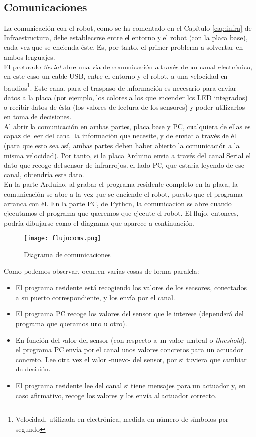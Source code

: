 \subsection{Comunicaciones}\label{subsec:comunicaciones}
La comunicación con el robot, como se ha comentado en el Capítulo \ref{cap:infra} de Infraestructura, debe establecerse entre el entorno y el robot (con la placa base), cada vez que se encienda éste. Es, por tanto, el primer problema a solventar en ambos lenguajes. \\ 
El protocolo \textit{Serial} abre una vía de comunicación a través de un canal electrónico, en este caso un cable USB, entre el entorno y el robot, a una velocidad en baudios\footnote{Velocidad, utilizada en electrónica, medida en número de símbolos por segundo}. Este canal para el traspaso de información es necesario para enviar datos a la placa (por ejemplo, los colores a los que encender los LED integrados) o recibir datos de ésta (los valores de lectura de los sensores) y poder utilizarlos en toma de decisiones. \\
Al abrir la comunicación en ambas partes, placa base y PC, cualquiera de ellas es capaz de leer del canal la información que necesite, y de enviar a través de él (para que esto sea así, ambas partes deben haber abierto la comunicación a la misma velocidad). Por tanto, si la placa Arduino envia a través del canal Serial el dato que recoge del sensor de infrarrojos, el lado PC, que estaría leyendo de ese canal, obtendría este dato. \\
En la parte Arduino, al grabar el programa residente completo en la placa, la comunicación se abre a la vez que se enciende el robot, puesto que el programa arranca con él. En la parte PC, de Python, la comunicación se abre cuando ejecutamos el programa que queremos que ejecute el robot. El flujo, entonces, podría dibujarse como el diagrama que aparece a continuación.
\begin{figure}[h]
	\texttt{[image: flujocoms.png]}
	\centering
	\label{img:FlujoComunicaciones}
	\caption{Diagrama de comunicaciones}
\end{figure}
Como podemos observar, ocurren varias cosas de forma paralela:
\begin{itemize}
	\item El programa residente está recogiendo los valores de los sensores, conectados a su puerto correspondiente, y los envía por el canal.
	\item El programa PC recoge los valores del sensor que le interese (dependerá del programa que queramos uno u otro).
	\item En función del valor del sensor (con respecto a un valor umbral o \textit{threshold}), el programa PC envía por el canal unos valores concretos para un actuador concreto. Lee otra vez el valor -nuevo- del sensor, por si tuviera que cambiar de decisión.
	\item El programa residente lee del canal si tiene mensajes para un actuador y, en caso afirmativo, recoge los valores y los envía al actuador correcto.
\end{itemize}

